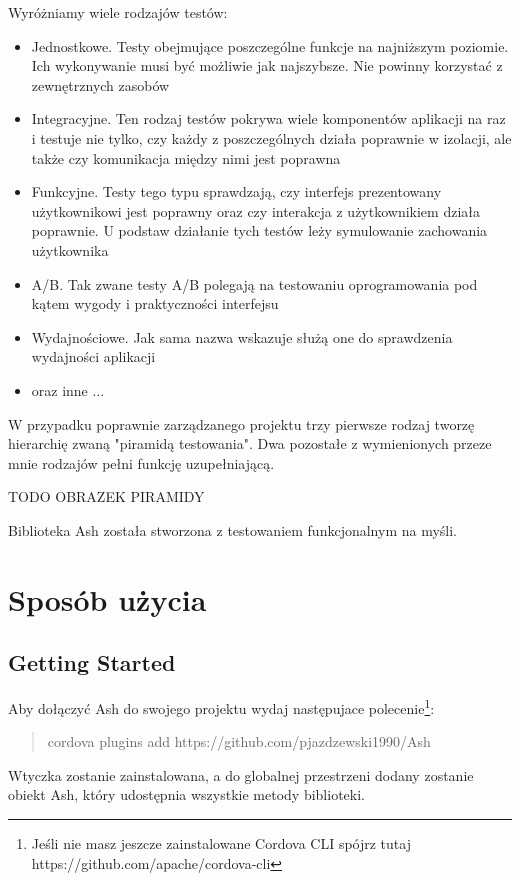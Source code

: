 \documentclass[brudnopis]{xmgr}
\begin{document}
Wyróżniamy wiele rodzajów testów:
\begin{itemize}
  \item Jednostkowe. Testy obejmujące poszczególne funkcje na najniższym poziomie. Ich wykonywanie musi być możliwie jak najszybsze. Nie powinny korzystać z zewnętrznych zasobów
  \item Integracyjne. Ten rodzaj testów pokrywa wiele komponentów aplikacji na raz i testuje nie tylko, czy każdy z poszczególnych działa poprawnie w izolacji, ale także czy komunikacja między nimi jest poprawna
  \item Funkcyjne. Testy tego typu sprawdzają, czy interfejs prezentowany użytkownikowi jest poprawny oraz czy interakcja z użytkownikiem działa poprawnie. U podstaw działanie tych testów leży symulowanie zachowania użytkownika
  \item A/B. Tak zwane testy A/B polegają na testowaniu oprogramowania pod kątem wygody i praktyczności interfejsu
  \item Wydajnościowe. Jak sama nazwa wskazuje służą one do sprawdzenia wydajności aplikacji
  \item oraz inne ...
\end{itemize}

W przypadku poprawnie zarządzanego projektu trzy pierwsze rodzaj tworzę hierarchię zwaną "piramidą testowania". Dwa pozostałe z wymienionych przeze mnie rodzajów pełni funkcję uzupełniającą. 

{TODO OBRAZEK PIRAMIDY}

Biblioteka Ash została stworzona z testowaniem funkcjonalnym na myśli.

\chapter{Sposób użycia}
\section{Getting Started}

Aby dołączyć Ash do swojego projektu wydaj następujace polecenie\footnote{Jeśli nie masz jeszcze zainstalowane Cordova CLI spójrz tutaj https://github.com/apache/cordova-cli}:
\begin{quote}
   cordova plugins add https://github.com/pjazdzewski1990/Ash
\end{quote}

Wtyczka zostanie zainstalowana, a do globalnej przestrzeni dodany zostanie obiekt Ash, który udostępnia wszystkie metody biblioteki.
\end{document}
